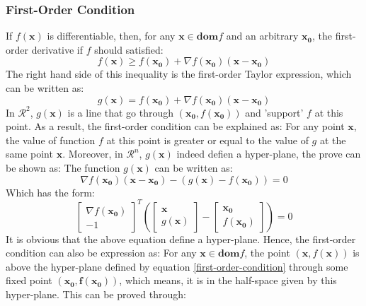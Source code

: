 \documentclass[10pt,a4paper]{article}
\begin{document}
\subsubsection{First-Order Condition}
If $f(\mathbf{x})$ is differentiable, then, for any $\mathbf{x} \in \mathbf{dom} f$ and an arbitrary $\mathbf{x_{0}}$, the first-order derivative if $f$ should satisfied:
\begin{equation}
	f(\mathbf{x}) \geq f(\mathbf{x_{0}}) + \nabla f(\mathbf{x_{0}})(\mathbf{x} - \mathbf{x_{0}})
	\label{1-condition}
\end{equation}
The right hand side of this inequality is the first-order Taylor expression, which can be written as:
\begin{equation*}
	g(\mathbf{x}) = f(\mathbf{x_{0}}) + \nabla f(\mathbf{x_{0}})(\mathbf{x} - \mathbf{x_{0}})
\end{equation*}
In $\mathcal{R}^{2}$, $g(\mathbf{x})$ is a line that go through $(\mathbf{x_{0}}, f(\mathbf{x_{0}}))$ and 'support' $f$ at this point. As a result, the first-order condition can be explained as: For any point $\mathbf{x}$, the value of function $f$ at this point is greater or equal to the value of $g$ at the same point $\mathbf{x}$. Moreover, in $\mathcal{R}^{n}$, $g(\mathbf{x})$ indeed defien a hyper-plane, the prove can be shown as: The function $g(\mathbf{x})$ can be written as:
\begin{equation*}
	\nabla f(\mathbf{x_{0}})(\mathbf{x} - \mathbf{x_{0}}) - (g(\mathbf{x}) - f(\mathbf{x_{0}})) = 0
\end{equation*}
Which has the form:
\begin{equation}
	\begin{bmatrix}
	\nabla f(\mathbf{x_{0}}) \\
	-1
	\end{bmatrix} ^{T}(
	\begin{bmatrix}
		\mathbf{x} \\
		g(\mathbf{x})
	\end{bmatrix} - 
	\begin{bmatrix}
		\mathbf{x_{0}} \\
		f(\mathbf{x_{0}})
	\end{bmatrix}) = 0
	\label{first-order-condition}
\end{equation}
It is obvious that the above equation define a hyper-plane. Hence, the first-order condition can also be expression as: For any $\mathbf{x} \in \mathbf{dom}f$, the point $(\mathbf{x}, f(\mathbf{x}))$ is above the hyper-plane defined by equation \ref{first-order-condition} through some fixed point $(\mathbf{x_{0}, f(\mathbf{x_{0}})})$, which means, it is in the half-space given by this hyper-plane. This can be proved through:
\end{document}

